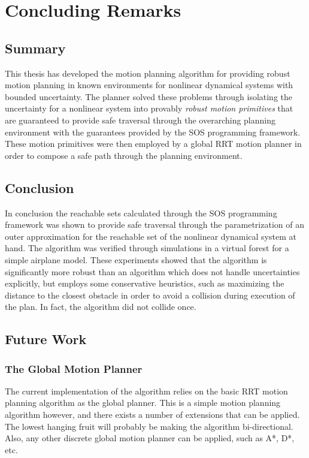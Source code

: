 \chapter{Concluding Remarks}
\label{chp:concluding-remarks}

\section{Summary}

This thesis has developed the \rrtfunnel{} motion planning algorithm for
providing robust motion planning in known environments for nonlinear dynamical
systems with bounded uncertainty. The planner solved these problems through
isolating the uncertainty for a nonlinear system into provably \textit{robust
  motion primitives} that are guaranteed to provide safe traversal through the
overarching planning environment with the guarantees provided by the \ac{SOS}
programming framework. These motion primitives were then employed by a global
\ac{RRT} motion planner in order to compose a safe path through the planning
environment.

\section{Conclusion}

In conclusion the reachable sets calculated through the \ac{SOS} programming
framework was shown to provide safe traversal through the parametrization of an
outer approximation for the reachable set of the nonlinear dynamical system at
hand. The algorithm was verified through simulations in a virtual forest for a
simple airplane model. These experiments showed that the \rrtfunnel{} algorithm
is significantly more robust than an algorithm which does not handle
uncertainties explicitly, but employs some conservative heuristics, such as
maximizing the distance to the closest obstacle in order to avoid a collision
during execution of the plan. In fact, the \rrtfunnel{} algorithm did not
collide once.


\section{Future Work}

\subsection{The Global Motion Planner}

The current implementation of the \rrtfunnel{} algorithm relies on the basic
\ac{RRT} motion planning algorithm as the global planner. This is a simple
motion planning algorithm however, and there exists a number of extensions that
can be applied. The lowest hanging fruit will probably be making the algorithm
bi-directional. Also, any other discrete global motion planner can be applied,
such as A*, D*, etc.

